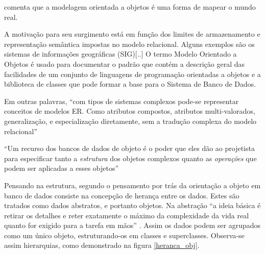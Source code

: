  comenta que a modelagem orientada a objetos é uma forma de mapear o mundo real. 
\begin{citacao}
    A motivação para seu surgimento está em função dos limites de armazenamento e representação semântica impostas no modelo relacional. Alguns exemplos são os sistemas de informações geográficas (SIG)[..] O termo Modelo Orientado a Objetos é usado para documentar o padrão que contém a descrição geral das facilidades de um conjunto de linguagens de programação orientadas a objetos e a biblioteca de classes que pode formar a base para o Sistema de Banco de Dados. \cite[p.8-9]{alexandruk2011modelagem}
\end{citacao}

Em outras palavras, ``com tipos de sistemas complexos pode-se representar conceitos de modelos ER. Como atributos compostos, atributos multi-valorados, generalização, e especialização diretamente, sem a tradução complexa do modelo relacional'' \cite[p.947]{korth2010database}

``Um recurso dos bancos de dados de objeto é o poder que eles dão ao projetista para especificar tanto a \textit{estrutura} dos objetos complexos quanto as \textit{operações} que podem ser aplicadas a esses objetos'' \cite[p.236]{navathe2011fundamentals} 

Pensando na estrutura, segundo  o pensamento por trás da orientação a objeto em banco de dados consiste na concepção de herança entre os dados. Estes são tratados como dados abstratos, e portanto objetos. Na abstração ``a ideia básica é retirar os detalhes e reter exatamente o máximo da complexidade da vida real quanto for exigido para a tarefa em mãos'' \cite[p.142]{teorey2014projeto}.  Assim os dados podem ser agrupados como um único objeto, estruturando-os em classes e superclasses. Observa-se assim hierarquias, como demonstrado na figura \ref{heranca_obj}.

